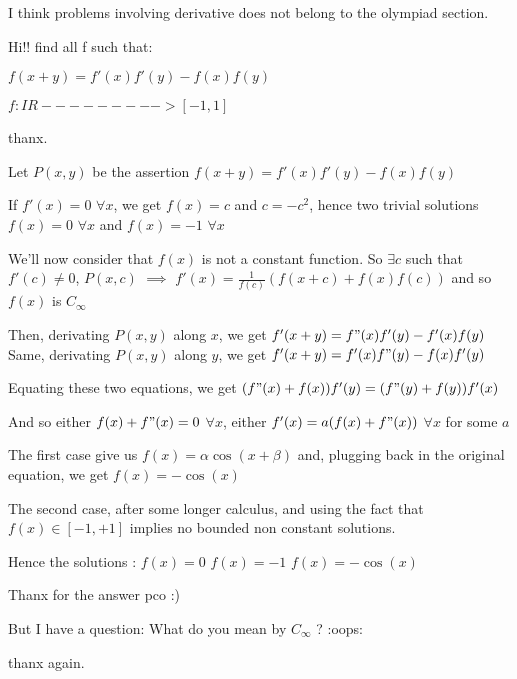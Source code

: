 \begin{solution}
	I think problems involving derivative does not belong to the olympiad section.
\end{solution}



\begin{solution}
	\begin{tcolorbox}Hi!!
find all f such that:

$ f(x + y) = f'(x)f'(y) - f(x)f(y)$

$ f: IR - - - - - - - - - > [ - 1,1]$

thanx.\end{tcolorbox}

Let $ P(x,y)$ be the assertion $ f(x+y)=f'(x)f'(y)-f(x)f(y)$

If $ f'(x)=0$ $ \forall x$, we get $ f(x)=c$ and $ c=-c^2$, hence two trivial solutions $ f(x)=0$ $ \forall x$ and $ f(x)=-1$ $ \forall x$

We'll now consider that $ f(x)$ is not a constant function. So $ \exists c$ such that $ f'(c)\neq 0$, $ P(x,c)$ $ \implies$  $ f'(x)=\frac{1}{f(c)}(f(x+c)+f(x)f(c))$ and so $ f(x)$ is $ C_{\infty}$

Then, derivating $ P(x,y)$ along $ x$, we get $ f'(x+y)=f"(x)f'(y)-f'(x)f(y)$
Same, derivating $ P(x,y)$ along $ y$, we get $ f'(x+y)=f'(x)f"(y)-f(x)f'(y)$

Equating these two equations, we get $ (f"(x)+f(x))f'(y)=(f"(y)+f(y))f'(x)$

And so either $ f(x)+f"(x)=0$ $ \forall x$, either $ f'(x)=a(f(x)+f"(x))$ $ \forall x$ for some $ a$

The first case give us $ f(x)=\alpha\cos(x+\beta)$ and, plugging back in the original equation, we get $ f(x)=-\cos(x)$

The second case, after some longer calculus, and using the fact that $ f(x)\in[-1,+1]$ implies no bounded non constant solutions.

Hence the solutions :
$ f(x)=0$ 
$ f(x)=-1$
$ f(x)=-\cos(x)$
\end{solution}



\begin{solution}
	Thanx for the answer pco  :) 
 
But I have a question: What do you mean by $ C_{\infty}$ ? :oops: 

thanx again.
\end{solution}



